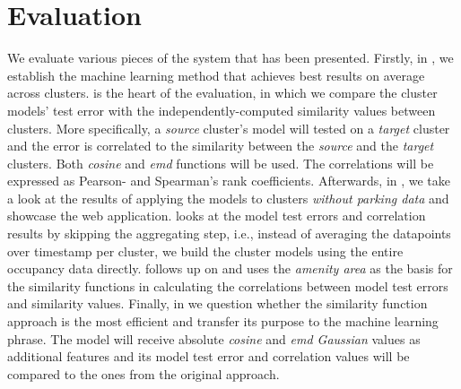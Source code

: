 \documentclass{article}
\newcommand{\cmmnt}[1]{\ignorespaces}
\begin{document}
	\section{Evaluation}
	We evaluate various pieces of the system that has been presented. Firstly, in \cmmnt{\cref{evaluation:best_model}}, we  establish the machine learning method that achieves best results on average across clusters. \cmmnt{\Cref{evaluation:similarity_vs_estimation_sec}} is the heart of the evaluation, in which we compare the cluster models' test error with the independently-computed similarity values between clusters. More specifically, a \textit{source} cluster's model will tested on a \textit{target} cluster and the error is correlated to the similarity between the \textit{source} and the \textit{target} clusters. Both \textit{cosine} and \textit{emd} functions will be used. The correlations will be expressed as Pearson- and Spearman's rank coefficients. Afterwards, in \cmmnt{\cref{evaluation:estimations_cwout}}, we take a look at the results of applying the models to clusters \textit{without parking data} and showcase the web application. \cmmnt{\Cref{evaluation:entire_datapoints}} looks at the model test errors and correlation results by skipping the aggregating step, i.e., instead of averaging the datapoints over timestamp per cluster, we build the cluster models using the entire occupancy data directly. \cmmnt{\Cref{evaluation:amenity_area}} follows up on \cmmnt{\cref{experimental_setup:amenity_area}} and uses the \textit{amenity area} as the basis for the similarity functions in calculating the correlations between model test errors and similarity values. Finally, in \cmmnt{\cref{evaluation:machine_learning_better}} we question whether the similarity function approach is the most efficient and transfer its purpose to the machine learning phrase. The model will receive absolute \textit{cosine} and \textit{emd Gaussian} values as additional features and its model test error and correlation values will be compared to the ones from the original approach.
	
	
	
\end{document}
